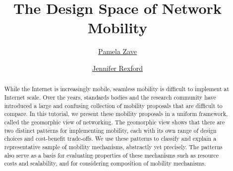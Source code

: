 \documentclass{article}
\title{The Design Space of Network Mobility}
\author{
\href{http://www2.research.att.com/~pamela/}{Pamela Zave} \\
\and
\href{http://www.cs.princeton.edu/~jrex/}{Jennifer Rexford} \\
}
\date{}
\begin{document}
\copyrightstatement


\maketitle

\thispagestyle{empty}



\begin{abstract}
While the Internet is increasingly mobile, seamless mobility is
difficult to implement at Internet scale.  Over the years, standards
bodies and the research community have introduced a large and
confusing collection of mobility proposals that are difficult to
compare.  In this tutorial, we present these mobility proposals
in a uniform framework, called the geomorphic view of networking.
The geomorphic view shows that there are two distinct patterns
for implementing mobility, each with its own range of 
design choices and cost-benefit trade-offs.
We use these patterns to classify and explain
a representative sample of mobility
mechanisms, abstractly yet precisely.
The patterns also serve as a basis for evaluating properties of
these mechanisms such as resource costs and scalability,
and for considering composition of mobility mechanisms.
\end{abstract}



















%


\end{document}
